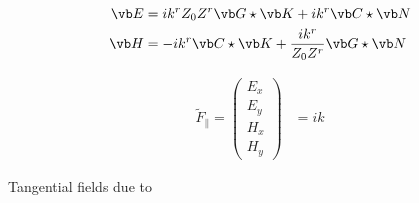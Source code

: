 \documentclass[letterpaper]{article}
\renewcommand{\wt}{\widetilde}
\begin{document}
\begin{align*}
  \vb E &= i k^r Z_0 Z^r \vb G \star \vb K + ik^r \vb C \star \vb N 
\\
  \vb H &= -i k^r        \vb C \star \vb K + \frac{ik^r}{Z_0Z^r} \vb G \star \vb N
\end{align*}

\begin{align*}
\wt F_\parallel=
 \left(\begin{array}{c} E_x \\ E_y \\ H_x \\ H_y\end{array}\right)
 &=ik
\end{align*}

Tangential fields due to
\begin{align*}
\end{align*}
\end{document}
